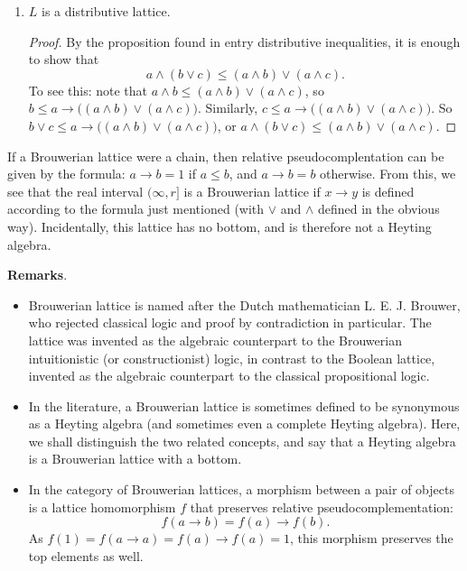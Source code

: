 \documentclass[12pt]{article}
\begin{document}
\begin{enumerate}
\begin{proof}
On the other hand, 
\begin{eqnarray*}
\big( (a\to b)\to (a\to c)\big) \wedge (a\wedge b) &=& \big( (a\to b)\to (a\to c)\big) \wedge \big( a\wedge (a\to b)\big) \\ &=& \big( (a\to b)\wedge (a\to c)\big) \wedge a \\ &=& (a\wedge b)\wedge (a\to c) \\ &=& b\wedge (a\wedge c)\le c
,
\end{eqnarray*}
 so $(a\to b)\to (a\to c)\le (a\wedge b)\to c$.
\end{proof}
\item $L$ is a distributive lattice.
\begin{proof}
By the proposition found in entry distributive inequalities, it is enough to show that $$a\wedge (b\vee c)\le  (a\wedge b)\vee (a\wedge c).$$  To see this: note that $a\wedge b\le (a\wedge b)\vee (a\wedge c)$, so $b\le a\to \big( (a\wedge b)\vee (a\wedge c)\big)$.  Similarly, $c\le a\to \big( (a\wedge b)\vee (a\wedge c)\big)$.  So $b\vee c \le a\to \big( (a\wedge b)\vee (a\wedge c)\big)$, or $a\wedge (b\vee c)\le  (a\wedge b)\vee (a\wedge c)$.
\end{proof}
\end{enumerate}

If a Brouwerian lattice were a chain, then relative pseudocomplentation can be given by the formula: $a\to b = 1$ if $a\le b$, and $a\to b = b$ otherwise.  From this, we see that the real interval $(\infty, r]$ is a Brouwerian lattice if 
$x\to y$ is defined according to the formula just mentioned (with $\vee$ and $\wedge$ defined in the obvious way).  Incidentally, this lattice has no bottom, and is therefore not a Heyting algebra.

\textbf{Remarks}.  
\begin{itemize}
\item Brouwerian lattice is named after the Dutch mathematician L. E. J. Brouwer, who rejected classical logic and proof by contradiction in particular.  The lattice was invented as the algebraic counterpart to the Brouwerian intuitionistic (or constructionist) logic, in contrast to the Boolean lattice, invented as the algebraic counterpart to the classical propositional logic.
\item In the literature, a Brouwerian lattice is sometimes defined to be synonymous as a Heyting algebra (and sometimes even a complete Heyting algebra).  Here, we shall distinguish the two related concepts, and say that a Heyting algebra is a Brouwerian lattice with a bottom.
\item In the category of Brouwerian lattices, a morphism between a pair of objects is a lattice homomorphism $f$ that preserves relative pseudocomplementation: $$f(a\to b)=f(a)\to f(b).$$
As $f(1)=f(a\to a)=f(a)\to f(a)=1$, this morphism preserves the top elements as well.
\end{itemize}
\end{document}
